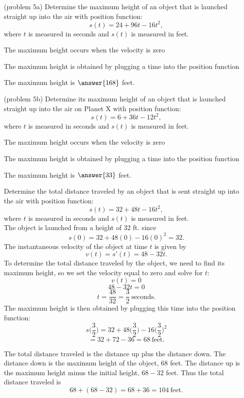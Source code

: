 \documentclass{ximera}
\begin{document}
\begin{problem}(problem 5a)
Determine the maximum height
of an object that is launched straight up into the air with position function:
\[s(t) = 24 + 96t - 16t^2,\]
where $t$ is measured in seconds and $s(t)$ is measured in feet. 

\begin{hint}
The maximum height occurs when the velocity is zero
\end{hint}
\begin{hint}
The maximum height is obtained by plugging a time into the position function
\end{hint}

The maximum height is $\answer{168}$ feet.

\end{problem}


\begin{problem}(problem 5b)
Determine its maximum height
of an object that is launched straight up into the air on Planet X with position function:
\[s(t) = 6 + 36t - 12t^2,\]
where $t$ is measured in seconds and $s(t)$ is measured in feet. 

\begin{hint}
The maximum height occurs when the velocity is zero
\end{hint}
\begin{hint}
The maximum height is obtained by plugging a time into the position function
\end{hint}

The maximum height is $\answer{33}$ feet.

\end{problem}
 
 
\begin{example}[example 6]
Determine the total distance traveled by
an object that is sent straight up into the air with position function:
\[s(t) = 32 + 48t - 16t^2,\]
where $t$ is measured in seconds and $s(t)$ is measured in feet. \\
The object is launched from a height of 32 ft. since 
\[s(0) = 32 + 48(0) - 16(0)^2 = 32.\]
The instantaneous velocity of the object at time $t$ is given by
\[v(t) = s'(t) = 48-32t.\]
To determine the total distance traveled by the object, we need to find its maximum height, so
we set the velocity equal to zero and solve for $t$:
\[v(t) = 0  \] 
\[48-32t = 0\]
\[t = \frac{48}{32} = \frac{3}{2} \ \text{seconds}.\]
The maximum height is then obtained by plugging this time into the position function:
\[s\Big(\frac{3}{2}\Big) = 32 + 48\Big(\frac{3}{2}\Big) - 16\Big(\frac{3}{2}\Big)^2 \]
\[= 32 + 72 - 36 = 68 \  \text{feet}. \]

The total distance traveled is the distance up plus the distance down.  The distance down is the maximum height of the object,
$68$ feet.  The distance up is the maximum height minus the initial height, $68 - 32$ feet.
Thus the total distance traveled is  
\[68 + (68 - 32) = 68 + 36 = 104 \ \text{feet}.\]
\end{example}
\end{document}
